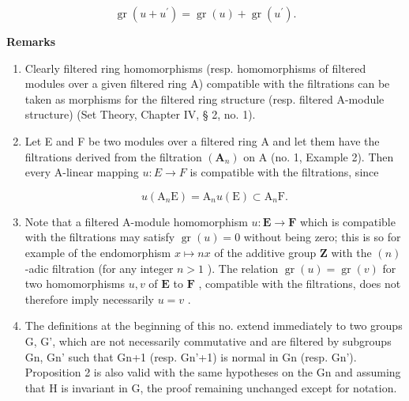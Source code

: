 \[
\operatorname{gr} (u + u ^ {\prime}) = \operatorname{gr} (u) + \operatorname{gr} (u ^ {\prime}).\tag{14}
\]

\textbf{Remarks}\par

\begin{enumerate}
\def\labelenumi{(\arabic{enumi})}
\item
  Clearly filtered ring homomorphisms (resp. homomorphisms of filtered modules over a given filtered ring A) compatible with the filtrations can be taken as morphisms for the filtered ring structure (resp. filtered A-module structure) (Set Theory, Chapter IV, § 2, no. 1).
\item
  Let E and F be two modules over a filtered ring A and let them have the filtrations derived from the filtration \((\mathbf{A}_{n})\) on A (no. 1, Example 2). Then every A-linear mapping \(u: E \rightarrow F\) is compatible with the filtrations, since

\[
u (\mathrm{A} _ {n} \mathrm{E}) = \mathrm{A} _ {n} u (\mathrm{E}) \subset \mathrm{A} _ {n} \mathrm{F}.
\]

\item
  Note that a filtered A-module homomorphism \(u: \mathbf{E} \to \mathbf{F}\) which is compatible with the filtrations may satisfy \(\operatorname{gr}(u) = 0\) without being zero; this is so for example of the endomorphism \(x \mapsto nx\) of the additive group \(\mathbf{Z}\) with the \((n)\) -adic filtration (for any integer \(n > 1\) ). The relation \(\operatorname{gr}(u) = \operatorname{gr}(v)\) for two homomorphisms \(u, v\) of \(\mathbf{E}\) to \(\mathbf{F}\) , compatible with the filtrations, does not therefore imply necessarily \(u = v\) .
\item
  The definitions at the beginning of this no. extend immediately to two groups G, G', which are not necessarily commutative and are filtered by subgroups Gn, Gn' such that Gn+1 (resp. Gn'+1) is normal in Gn (resp. Gn'). Proposition 2 is also valid with the same hypotheses on the Gn and assuming that H is invariant in G, the proof remaining unchanged except for notation.
\end{enumerate}

